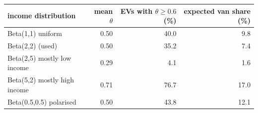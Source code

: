 \begin{tabular}{@{}lrrr@{}}
\toprule
income distribution & mean $\theta$ & EVs with $\theta\ge0.6$ (\%) & expected van share (\%) \\
\midrule
Beta(1,1) uniform & 0.50 & 40.0 & 9.8 \\
Beta(2,2) (used) & 0.50 & 35.2 & 7.4 \\
Beta(2,5) mostly low income & 0.29 & 4.1 & 1.6 \\
Beta(5,2) mostly high income & 0.71 & 76.7 & 17.0 \\
Beta(0.5,0.5) polarised & 0.50 & 43.8 & 12.1 \\
\bottomrule
\end{tabular}

